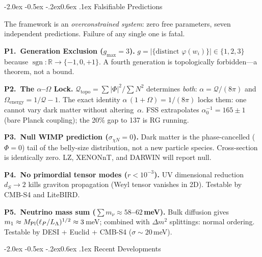 \documentclass[aps,prl,twocolumn,superscriptaddress,nofootinbib,amsmath,amssymb,floatfix]{revtex4-2}
\makeatletter
\def\sec@upcase#1{\uppercase{#1}}
\renewcommand\section{\@startsection{section}{1}{\z@}%
  {-2.0ex \@plus -0.5ex \@minus -.2ex}{0.6ex \@plus .1ex}%
  {\normalfont\small\bfseries\centering\sec@upcase}}
\makeatother
\begin{document}
\section{Falsifiable Predictions}\label{sec:predictions}

The framework is an \emph{overconstrained system}: zero free parameters,
seven independent predictions.  Failure of any single one is fatal.

\textbf{P1.\ Generation Exclusion ($g_{\max} = 3$).}
$g = |\{\text{distinct } \varphi(w_i)\}| \in \{1,2,3\}$ because
$\operatorname{sgn} \colon \mathbb{R} \to \{-1,0,+1\}$.
A fourth generation is topologically forbidden---a theorem, not a bound.

\textbf{P2.\ The $\alpha$--$\Omega$ Lock.}
$\mathcal{Q}_{\mathrm{topo}} = \sum|\Phi|^2/\sum N^2$
determines \emph{both}: $\alpha = \mathcal{Q}/(8\pi)$
and $\Omega_{\mathrm{energy}} = 1/\mathcal{Q} - 1$.
The exact identity $\alpha\,(1 + \Omega) = 1/(8\pi)$ locks them:
one cannot vary dark matter without altering~$\alpha$.
FSS extrapolates $\alpha^{-1}_0 = 165 \pm 1$ (bare Planck coupling);
the 20\% gap to 137 is RG running.

\textbf{P3.\ Null WIMP prediction ($\sigma_{\chi N} = 0$).}
Dark matter is the phase-cancelled ($\Phi = 0$) tail of the belly-size
distribution, not a new particle species.
Cross-section is identically zero.
LZ, XENONnT, and DARWIN will report null.

\textbf{P4.\ No primordial tensor modes ($r < 10^{-3}$).}
UV dimensional reduction $d_S \to 2$ kills graviton propagation
(Weyl tensor vanishes in 2D).
Testable by CMB-S4 and LiteBIRD.

\textbf{P5.\ Neutrino mass sum ($\sum m_\nu \approx 58$--$62$\,meV).}
Bulk diffusion gives
$m_1 \approx M_{\rm Pl}(\ell_P/L_\Lambda)^{1/2} \approx 3$\,meV;
combined with $\Delta m^2$ splittings: normal ordering.
Testable by DESI + Euclid + CMB-S4 ($\sigma \sim 20$\,meV).

\section{Recent Developments}\label{sec:recent}
\end{document}
